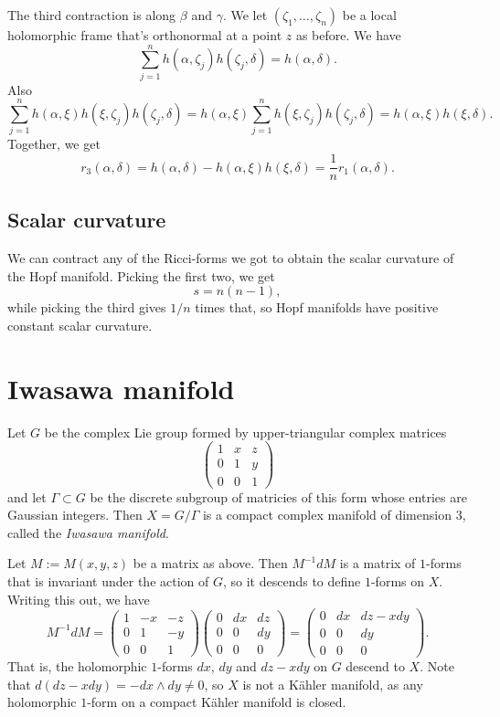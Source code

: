 \documentclass[11pt]{article}
\theoremstyle{definition}
\begin{document}
The third contraction is along \(\beta\) and \(\gamma\). We let \((\zeta_1, \ldots, \zeta_n)\) be a local holomorphic frame that's orthonormal at a point \(z\) as before. We have
$$
\sum_{j=1}^n h(\alpha, \zeta_j) h(\zeta_j, \delta)
= h(\alpha, \delta).
$$
Also
$$
\sum_{j=1}^n h(\alpha, \xi) h(\xi, \zeta_j) h(\zeta_j, \delta)
= h(\alpha, \xi) \sum_{j=1}^n  h(\xi, \zeta_j) h(\zeta_j, \delta)
= h(\alpha, \xi) h(\xi, \delta).
$$
Together, we get
$$
r_3(\alpha, \delta)
= h(\alpha, \delta) - h(\alpha, \xi) h(\xi, \delta)
= \frac{1}{n} r_1(\alpha, \delta).
$$

\subsection{Scalar curvature}
\label{sec:orgf9212d2}

We can contract any of the Ricci-forms we got to obtain the scalar curvature of the Hopf manifold. Picking the first two, we get
$$
s = n(n-1),
$$
while picking the third gives \(1/n\) times that, so Hopf manifolds have positive constant scalar curvature.


\section{Iwasawa manifold}
\label{sec:orgd67c2ff}

Let $G$ be the complex Lie group formed by upper-triangular complex matrices
$$
\begin{pmatrix}
  1 & x & z
  \\
  0 & 1 & y
  \\
  0 & 0 & 1
\end{pmatrix}
$$
and let $\Gamma \subset G$ be the discrete subgroup of matricies of this form whose entries are Gaussian integers. Then $X = G / \Gamma$ is a compact complex manifold of dimension $3$, called the \emph{Iwasawa manifold}.

Let $M := M(x,y,z)$ be a matrix as above. Then $M^{-1}dM$ is a matrix of $1$-forms that is invariant under the action of $G$, so it descends to define $1$-forms on $X$. Writing this out, we have
$$
M^{-1}dM
= \begin{pmatrix}
  1 & -x & -z
  \\
  0 & 1 & -y
  \\
  0 & 0 & 1
\end{pmatrix}
\begin{pmatrix}
  0 & dx & dz
  \\
  0 & 0 & dy
  \\
  0 & 0 & 0
\end{pmatrix}
=
\begin{pmatrix}
  0 & dx & dz - x dy
  \\
  0 & 0 & dy
  \\
  0 & 0 & 0
\end{pmatrix}.
$$
That is, the holomorphic $1$-forms $dx$, $dy$ and $dz - x dy$ on $G$ descend to $X$. Note that $d(dz - xdy) = -dx \wedge dy \not= 0$, so $X$ is not a K\"ahler manifold, as any holomorphic $1$-form on a compact K\"ahler manifold is closed.
\end{document}
